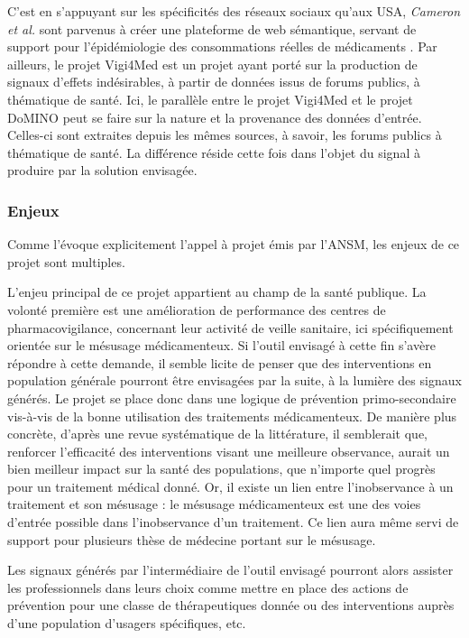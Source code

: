 \documentclass[a4paper, 12pt, openany, oneside, abstract=on]{article} %
\begin{document}
C'est en s'appuyant sur les spécificités des réseaux sociaux qu'aux USA, \emph{Cameron et al.} sont parvenus à créer une plateforme de web sémantique, servant de support pour l'épidémiologie des consommations réelles de médicaments \cite{Cameron2013}.
Par ailleurs, le projet Vigi4Med est un projet ayant porté sur la production de signaux d'effets indésirables, à partir de données issus de forums publics, à thématique de santé\cite{C.Bousquet2014}. Ici, le parallèle entre le projet Vigi4Med et le projet DoMINO peut se faire sur la nature et la provenance des données d'entrée. Celles-ci sont extraites depuis les mêmes sources, à savoir, les forums publics à thématique de santé. La différence réside cette fois dans l'objet du signal à produire par la solution envisagée.

\subsubsection{Enjeux}
Comme l'évoque explicitement l'appel à projet émis par l'ANSM, les enjeux de ce projet sont multiples.

L'enjeu principal de ce projet appartient au champ de la santé publique. La volonté première est une amélioration de performance des centres de pharmacovigilance, concernant leur activité de veille sanitaire, ici spécifiquement orientée sur le mésusage médicamenteux. Si l'outil envisagé à cette fin s'avère répondre à cette demande, il semble licite de penser que des interventions en population générale pourront être envisagées par la suite, à la lumière des signaux générés. Le projet se place donc dans une logique de prévention primo-secondaire vis-à-vis de la bonne utilisation des traitements médicamenteux. De manière plus concrète, d'après une revue systématique de la littérature, il semblerait que, renforcer l'efficacité des interventions visant une meilleure observance, aurait un bien meilleur impact sur la santé des populations, que n'importe quel progrès pour un traitement médical donné\cite{Haynes2002}. Or, il existe un lien entre l'inobservance à un traitement et son mésusage : le mésusage médicamenteux est une des voies d'entrée possible dans l'inobservance d'un traitement. Ce lien aura même servi de support pour plusieurs thèse de médecine portant sur le mésusage\cite{Marton2016,Henriet2016}.

Les signaux générés par l'intermédiaire de l'outil envisagé pourront alors assister les professionnels dans leurs choix comme mettre en place des actions de prévention pour une classe de thérapeutiques donnée ou des interventions auprès d'une population d'usagers spécifiques, etc.
\end{document}
